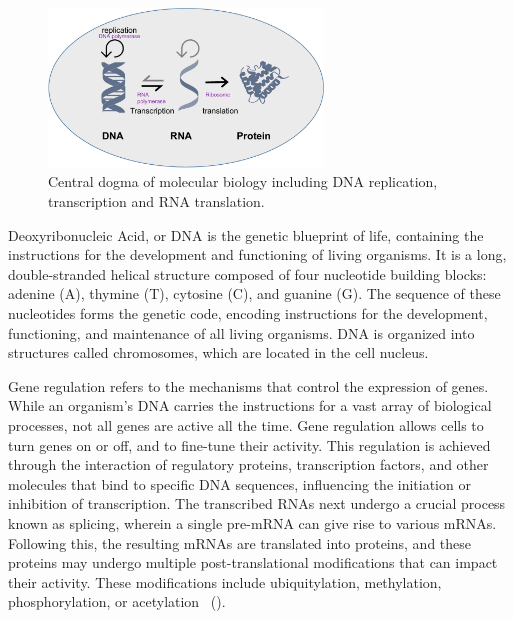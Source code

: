 \begin{figure}[!ht]
	\centering
	\includegraphics[width=0.65\textwidth]{central_dogma/fig}
	\vspace{0.1cm}
	\caption[central dogma.]{Central dogma of molecular biology including DNA replication, transcription and RNA translation.}
	\label{fig:central_dogma}
\end{figure}

Deoxyribonucleic Acid, or DNA is the genetic blueprint of life, containing the instructions for the development and functioning of living organisms. It is a long, double-stranded helical structure composed of four nucleotide building blocks: adenine (A), thymine (T), cytosine (C), and guanine (G). The sequence of these nucleotides forms the genetic code, encoding instructions for the development, functioning, and maintenance of all living organisms. DNA is organized into structures called chromosomes, which are located in the cell nucleus.



Gene regulation refers to the mechanisms that control the expression of genes. While an organism's DNA carries the instructions for a vast array of biological processes, not all genes are active all the time. Gene regulation allows cells to turn genes on or off, and to fine-tune their activity. This regulation is achieved through the interaction of regulatory proteins, transcription factors, and other molecules that bind to specific DNA sequences, influencing the initiation or inhibition of transcription. The transcribed RNAs next undergo a crucial process known as splicing, wherein a single pre-mRNA can give rise to various mRNAs. Following this, the resulting mRNAs are translated into proteins, and these proteins may undergo multiple post-translational modifications that can impact their activity. These modifications include ubiquitylation, methylation, phosphorylation, or acetylation~\citep{wang2014protein} ().


